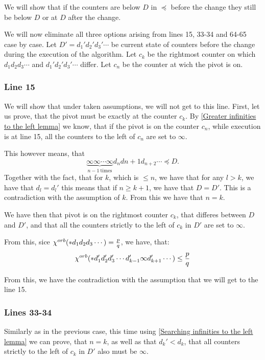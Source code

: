 We will show that if the counters are below $D$ in $\preceq$ before the change they still 
be below $D$ or at $D$ after the change. 

We will now eliminate all three options arising from lines 15, 33-34 and 64-65 case by case. 
Let $D' = d_1'd_2'd_3'\cdots$ be current state of counters before the change 
during the execution of the algorithm. 
Let $c_k$ be the rightmost counter on which $d_1d_2d_3\cdots$ 
and $d_1'd_2'd_3'\cdots$ differ. Let $c_n$ be the counter at wich the pivot is on. 
\subsubsection{Line 15}
We will show that under taken assumptions, we will not get to this line. 
First, let us prove, that the pivot must be exactly at the counter $c_k$. 
By \ref{Greater infinities to the left lemma} we know, that if the pivot is 
on the counter $c_n$, while execution is at line 15, 
all the counters to the left of $c_n$ are set to $\infty$. 

This however means, that
\begin{equation}
\underbrace{\infty\infty\cdots\infty}_{n-1\ \mathrm{times}}d_nd{n+1}d_{n+2}\cdots \preceq D.
\end{equation}
Together with the fact, that for $k$, which is $\leq n$, we have that 
for any $l > k$, we have that $d_l = d_l'$ this means that if $n \geq k+1$, we have that 
$D = D'$. This is a contradiction with the assumption of $k$. 
From this we have that $n = k$.

We have then that pivot is on the rightmost counter $c_k$, 
that differes between $D$ and $D'$, and 
that all the counters strictly to the left of $c_k$ in $D'$ are set to $\infty$. 


From this, sice ${\chi^{orb}(*d_1d_2d_3\cdots)} = \frac{p}{q}$, we have, that: 
\begin{equation}
{\chi^{orb}(*d_1'd_2'd_3'\cdots d_{k-1}'\infty d_{k+1}'\cdots)} \leq \frac{p}{q} 
\end{equation}

From this, we have the contradiction with the assumption that we will get to the line 15. 

\subsubsection{Lines 33-34}
Similarly as in the previous case, this time using \ref{Searching infinities to the left lemma} 
we can prove, that $n=k$, as well as that $d_k' < d_k$, that all 
counters strictly to the left of $c_k$ in $D'$ also must be $\infty$.

